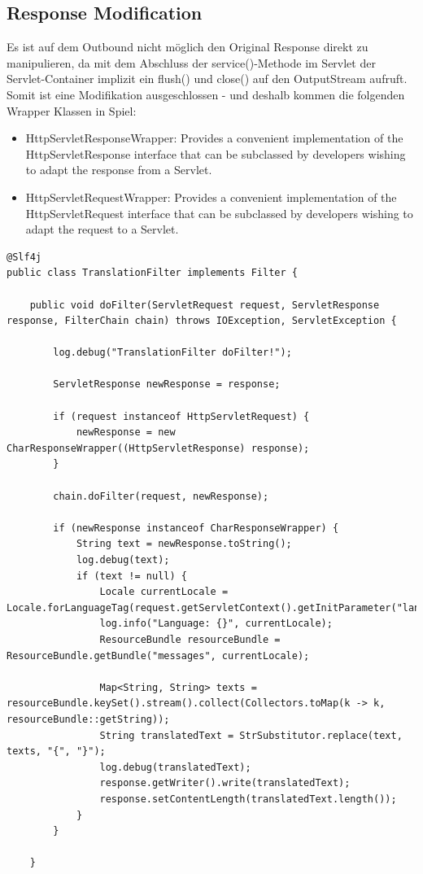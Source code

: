 \subsection{Response Modification}
Es ist auf dem Outbound nicht möglich den Original Response direkt zu manipulieren, da mit dem Abschluss der service()-Methode im Servlet der Servlet-Container implizit ein flush() und close() auf den OutputStream aufruft. Somit ist eine Modifikation ausgeschlossen - und deshalb kommen die folgenden Wrapper Klassen in Spiel:
\begin{itemize}
\item HttpServletResponseWrapper: Provides a convenient implementation of the HttpServletResponse interface that can be subclassed by developers wishing to adapt the response from a Servlet.
\item HttpServletRequestWrapper: Provides a convenient implementation of the HttpServletRequest interface that can be subclassed by developers wishing to adapt the request to a Servlet.
\end{itemize}
\begin{verbatim}
@Slf4j
public class TranslationFilter implements Filter {

    public void doFilter(ServletRequest request, ServletResponse response, FilterChain chain) throws IOException, ServletException {

        log.debug("TranslationFilter doFilter!");

        ServletResponse newResponse = response;

        if (request instanceof HttpServletRequest) {
            newResponse = new CharResponseWrapper((HttpServletResponse) response);
        }

        chain.doFilter(request, newResponse);

        if (newResponse instanceof CharResponseWrapper) {
            String text = newResponse.toString();
            log.debug(text);
            if (text != null) {
                Locale currentLocale = Locale.forLanguageTag(request.getServletContext().getInitParameter("lang"));
                log.info("Language: {}", currentLocale);
                ResourceBundle resourceBundle = ResourceBundle.getBundle("messages", currentLocale);

                Map<String, String> texts = resourceBundle.keySet().stream().collect(Collectors.toMap(k -> k, resourceBundle::getString));
                String translatedText = StrSubstitutor.replace(text, texts, "{", "}");
                log.debug(translatedText);
                response.getWriter().write(translatedText);
                response.setContentLength(translatedText.length());
            }
        }

    }

\end{verbatim}
